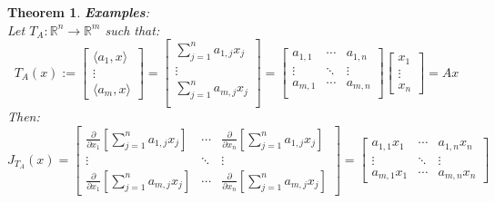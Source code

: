 \documentclass[12pt]{extarticle}
\theoremstyle{plain}
\newtheorem{thm}{Theorem}[section]
\theoremstyle{Definition}
\theoremstyle{Definition}
\theoremstyle{plain}
\begin{document}
\begin{thm} \textbf{Examples}: \\ 
	Let $T_A : \mathbb{R}^n \to \mathbb{R}^m$ such that:
	\[
	T_A(x) := 
	\begin{bmatrix}
	\langle a_1 , x \rangle \\
	\vdots \\
	\langle a_m , x \rangle
	\end{bmatrix}
	=
	\begin{bmatrix}
	\sum_{j=1}^{n} a_{1,j}x_j \\ 
	\vdots \\ 
	\sum_{j=1}^{n} a_{m,j}x_j \\ 	
	\end{bmatrix}
	= 
	\begin{bmatrix}
	a_{1,1} & \cdots & a_{1,n} \\ 
	\vdots & \ddots & \vdots \\ 
	a_{m,1} & \cdots & a_{m,n} \\ 	
	\end{bmatrix}
	\begin{bmatrix}
	x_1 \\ 
	\vdots \\ 
	x_n
	\end{bmatrix}
	= Ax
	\]
	Then: 
	\[
	J_{T_A}(x) = 
		\begin{bmatrix} 
		\frac{\partial }{\partial x_1}\left[\sum_{j=1}^{n} a_{1,j}x_j\right] & \cdots & \frac{\partial }{\partial x_n}\left[\sum_{j=1}^{n} a_{1,j}x_j\right] \\
		\vdots & \ddots & \vdots \\ 
		\frac{\partial }{\partial x_1}\left[\sum_{j=1}^{n} a_{m,j}x_j\right]& \cdots & \frac{\partial }{\partial x_n}\left[\sum_{j=1}^{n} a_{m,j}x_j\right] 
		\end{bmatrix}
		= 
		\begin{bmatrix} 
		 a_{1,1}x_1 & \cdots & a_{1,n}x_n \\
		\vdots & \ddots & \vdots \\ 
		a_{m,1}x_1 & \cdots & a_{m,n}x_n 
		\end{bmatrix}		
	\] 
\end{thm}

\newpage
\end{document}
